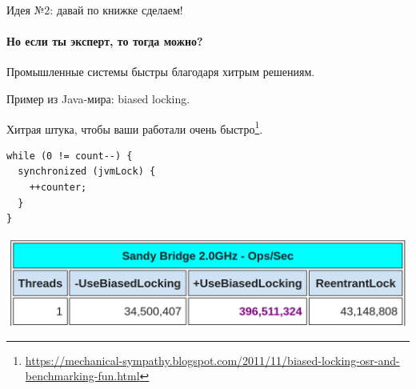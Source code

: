 \begin{frame}{Идея №2: давай по книжке сделаем!}
\framesubtitle{Но если ты эксперт, то тогда можно?}

Промышленные системы быстры благодаря хитрым решениям.

Пример из Java-мира: biased locking.

\pause
Хитрая штука, чтобы ваши  работали очень быстро\footnote<2->{\tiny\url{https://mechanical-sympathy.blogspot.com/2011/11/biased-locking-osr-and-benchmarking-fun.html}}.

\begin{verbatim}
while (0 != count--) {
  synchronized (jvmLock) {
    ++counter;
  }
}
\end{verbatim}

\pause
\begin{center}
\includegraphics[width=.8\textwidth]{production/biased-locking.png}
\end{center}

\end{frame}


